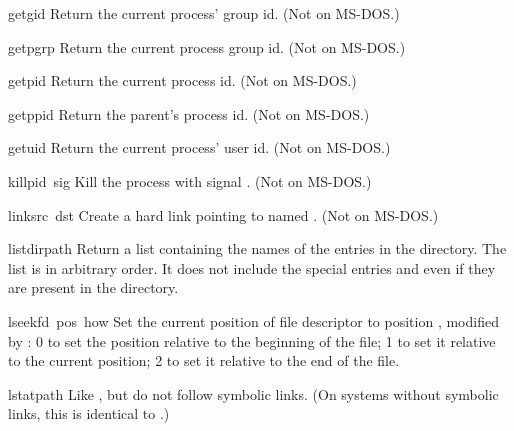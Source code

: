 \begin{funcdesc}{getgid}{}
Return the current process' group id.
(Not on MS-DOS.)
\end{funcdesc}

\begin{funcdesc}{getpgrp}{}
Return the current process group id.
(Not on MS-DOS.)
\end{funcdesc}

\begin{funcdesc}{getpid}{}
Return the current process id.
(Not on MS-DOS.)
\end{funcdesc}

\begin{funcdesc}{getppid}{}
Return the parent's process id.
(Not on MS-DOS.)
\end{funcdesc}

\begin{funcdesc}{getuid}{}
Return the current process' user id.
(Not on MS-DOS.)
\end{funcdesc}

\begin{funcdesc}{kill}{pid\, sig}
Kill the process  with signal .
(Not on MS-DOS.)
\end{funcdesc}

\begin{funcdesc}{link}{src\, dst}
Create a hard link pointing to  named .
(Not on MS-DOS.)
\end{funcdesc}

\begin{funcdesc}{listdir}{path}
Return a list containing the names of the entries in the directory.
The list is in arbitrary order.  It does not include the special
entries  and  even if they are present in the
directory.
\end{funcdesc}

\begin{funcdesc}{lseek}{fd\, pos\, how}
Set the current position of file descriptor  to position
, modified by : 0 to set the position relative to
the beginning of the file; 1 to set it relative to the current
position; 2 to set it relative to the end of the file.
\end{funcdesc}

\begin{funcdesc}{lstat}{path}
Like , but do not follow symbolic links.  (On systems
without symbolic links, this is identical to .)
\end{funcdesc}

